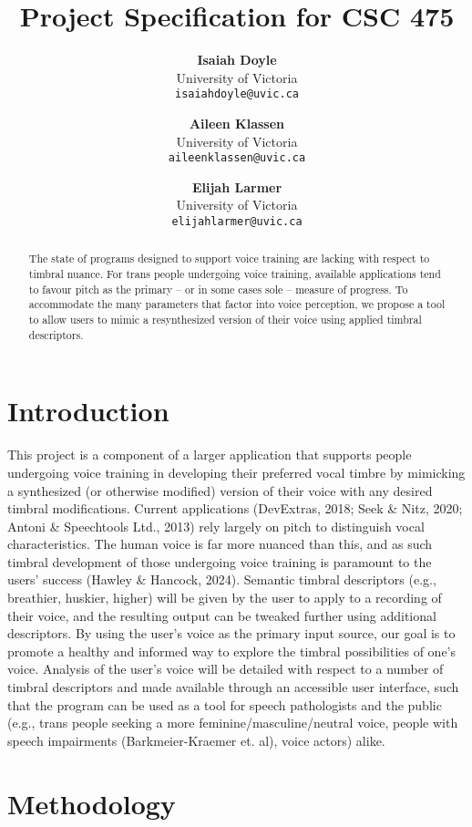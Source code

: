 \documentclass{article}
\title{Project Specification for CSC 475 \conferenceyear}
\author{
   \textbf{Isaiah Doyle}\\ {University of Victoria \\\texttt{isaiahdoyle@uvic.ca}}
   \and
   \textbf{Aileen Klassen}\\ {University of Victoria\\\texttt{aileenklassen@uvic.ca}}
   \and
   \textbf{Elijah Larmer}\\ {University of Victoria \\\texttt{elijahlarmer@uvic.ca}}
}
\begin{document}
\maketitle

\begin{abstract}
  The state of programs designed to support voice training are lacking with respect to timbral nuance. For trans people undergoing voice training, available applications tend to favour pitch as the primary – or in some cases sole – measure of progress. To accommodate the many parameters that factor into voice perception, we propose a tool to allow users to mimic a resynthesized version of their voice using applied timbral descriptors.
\end{abstract}

\section{Introduction}\label{sec:introduction}

This project is a component of a larger application that supports people undergoing voice training in developing their preferred vocal timbre by mimicking a synthesized (or otherwise modified) version of their voice with any desired timbral modifications. Current applications (DevExtras, 2018; Seek \& Nitz, 2020; Antoni \& Speechtools Ltd., 2013) rely largely on pitch to distinguish vocal characteristics. The human voice is far more nuanced than this, and as such timbral development of those undergoing voice training is paramount to the users’ success (Hawley \& Hancock, 2024). Semantic timbral descriptors (e.g., breathier, huskier, higher) will be given by the user to apply to a recording of their voice, and the resulting output can be tweaked further using additional descriptors. By using the user’s voice as the primary input source, our goal is to promote a healthy and informed way to explore the timbral possibilities of one’s voice. Analysis of the user’s voice will be detailed with respect to a number of timbral descriptors and made available through an accessible user interface, such that the program can be used as a tool for speech pathologists and the public (e.g., trans people seeking a more feminine/masculine/neutral voice, people with speech impairments (Barkmeier-Kraemer et. al), voice actors) alike.

\section{Methodology}
\end{document}
